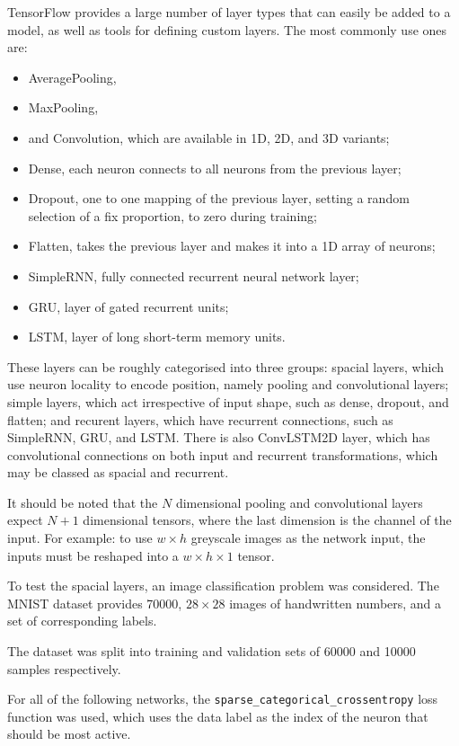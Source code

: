 TensorFlow provides a large number of layer types that can easily be added to a
model, as well as tools for defining custom layers.
The most commonly use ones are:
\begin{itemize}
    \item AveragePooling,
    \item MaxPooling,
    \item and Convolution, which are available in 1D, 2D, and 3D variants;

    \item Dense, each neuron connects to all neurons from the previous layer;
    \item Dropout, one to one mapping of the previous layer, setting a random
        selection of a fix proportion, to zero during training;
    \item Flatten, takes the previous layer and makes it into a 1D array of
        neurons;

    \item SimpleRNN, fully connected recurrent neural network layer;
    \item GRU, layer of gated recurrent units;
    \item LSTM, layer of long short-term memory units.
\end{itemize}
These layers can be roughly categorised into three groups:
spacial layers, which use neuron locality to encode position, namely pooling and
convolutional layers;
simple layers, which act irrespective of input shape, such as dense, dropout,
and flatten;
and recurent layers, which have recurrent connections, such as SimpleRNN, GRU,
and LSTM.
There is also ConvLSTM2D layer, which has convolutional connections on both
input and recurrent transformations, which may be classed as spacial and
recurrent.

It should be noted that the $N$ dimensional pooling and convolutional layers
expect $N+1$ dimensional tensors, where the last dimension is the channel of the
input.
For example: to use $w \times h$ greyscale images as the network input, the
inputs must be reshaped into a $w \times h \times 1$ tensor.

To test the spacial layers, an image classification problem was considered.
The MNIST dataset provides 70000, $28\times28$ images of handwritten numbers,
and a set of corresponding labels.

The dataset was split into training and validation sets of 60000 and 10000
samples respectively.

For all of the following networks, the
\texttt{sparse\_categorical\_crossentropy} loss function was used, which uses
the data label as the index of the neuron that should be most active.

